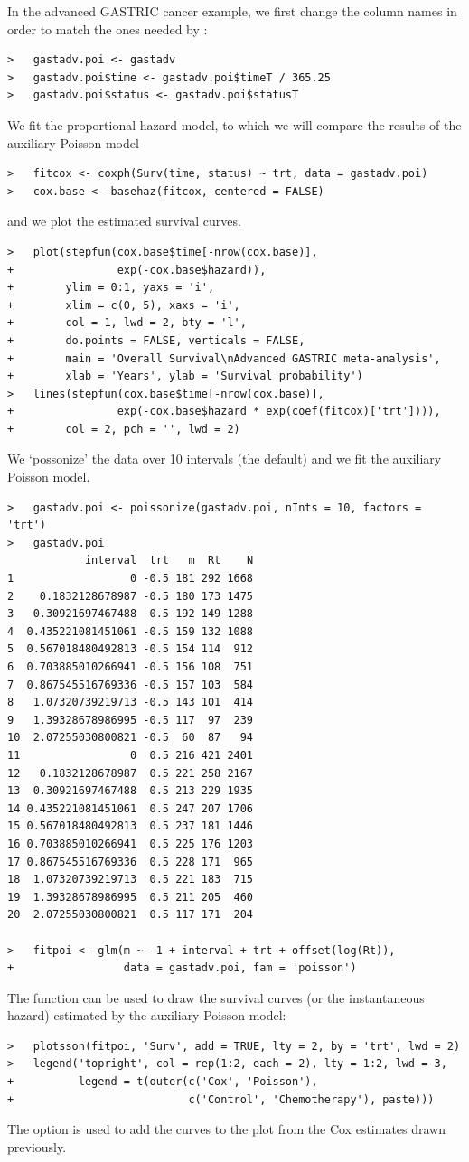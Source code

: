 \documentclass[]{scrartcl}\usepackage[]{graphicx}\usepackage[]{color}
\begin{document}
{{In the advanced GASTRIC cancer example,
  we first change the column names in order to match the ones needed by
  :
\begin{lstlisting}
>   gastadv.poi <- gastadv
>   gastadv.poi$time <- gastadv.poi$timeT / 365.25
>   gastadv.poi$status <- gastadv.poi$statusT
\end{lstlisting}
We fit the proportional hazard model, to which we will compare
  the results of the auxiliary Poisson model
\begin{lstlisting}
>   fitcox <- coxph(Surv(time, status) ~ trt, data = gastadv.poi)
>   cox.base <- basehaz(fitcox, centered = FALSE)
\end{lstlisting}
and we plot the estimated survival curves.
\begin{lstlisting}
>   plot(stepfun(cox.base$time[-nrow(cox.base)], 
+                exp(-cox.base$hazard)),
+        ylim = 0:1, yaxs = 'i',
+        xlim = c(0, 5), xaxs = 'i',
+        col = 1, lwd = 2, bty = 'l',
+        do.points = FALSE, verticals = FALSE,
+        main = 'Overall Survival\nAdvanced GASTRIC meta-analysis',
+        xlab = 'Years', ylab = 'Survival probability')
>   lines(stepfun(cox.base$time[-nrow(cox.base)],
+                exp(-cox.base$hazard * exp(coef(fitcox)['trt']))),
+        col = 2, pch = '', lwd = 2)
\end{lstlisting}

We `possonize' the data over 10 intervals (the default)
  and we fit the auxiliary Poisson model.
\begin{lstlisting}
>   gastadv.poi <- poissonize(gastadv.poi, nInts = 10, factors = 'trt')
>   gastadv.poi
            interval  trt   m  Rt    N
1                  0 -0.5 181 292 1668
2    0.1832128678987 -0.5 180 173 1475
3   0.30921697467488 -0.5 192 149 1288
4  0.435221081451061 -0.5 159 132 1088
5  0.567018480492813 -0.5 154 114  912
6  0.703885010266941 -0.5 156 108  751
7  0.867545516769336 -0.5 157 103  584
8   1.07320739219713 -0.5 143 101  414
9   1.39328678986995 -0.5 117  97  239
10  2.07255030800821 -0.5  60  87   94
11                 0  0.5 216 421 2401
12   0.1832128678987  0.5 221 258 2167
13  0.30921697467488  0.5 213 229 1935
14 0.435221081451061  0.5 247 207 1706
15 0.567018480492813  0.5 237 181 1446
16 0.703885010266941  0.5 225 176 1203
17 0.867545516769336  0.5 228 171  965
18  1.07320739219713  0.5 221 183  715
19  1.39328678986995  0.5 211 205  460
20  2.07255030800821  0.5 117 171  204

>   fitpoi <- glm(m ~ -1 + interval + trt + offset(log(Rt)), 
+                 data = gastadv.poi, fam = 'poisson')
\end{lstlisting}
The function  can be used to draw the survival curves
  (or the instantaneous hazard) estimated by the auxiliary Poisson model:
\begin{lstlisting}
>   plotsson(fitpoi, 'Surv', add = TRUE, lty = 2, by = 'trt', lwd = 2) 
>   legend('topright', col = rep(1:2, each = 2), lty = 1:2, lwd = 3,
+          legend = t(outer(c('Cox', 'Poisson'),
+                           c('Control', 'Chemotherapy'), paste)))
\end{lstlisting}
The option  is used to add the curves to the plot
  from the Cox estimates drawn previously.

}}
\end{document}
